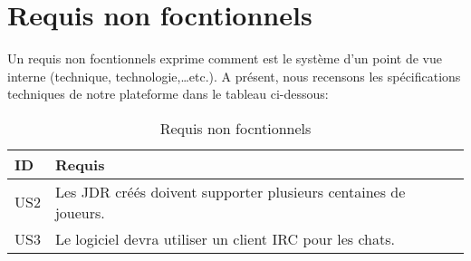 \documentclass[12pt,a4paper]{article}
\begin{document}
\section{Requis non focntionnels}
Un requis non focntionnels exprime comment est le
système d’un point de vue interne (technique,
technologie,…etc.). A présent, nous recensons les spécifications techniques de notre plateforme dans le tableau ci-dessous:
    \begin{table}[H]
	\centering

	\label{specifnonFonct}
	\begin{tabular}{|l | p{14.5cm}| }
		\hline	ID & Requis      \\\hline           
		US2	&Les JDR créés doivent supporter plusieurs centaines de joueurs. \\ \hline
		US3	&Le logiciel devra utiliser un client IRC pour les chats. \\ \hline
		
	\end{tabular}
		\caption{Requis non focntionnels}
\end{table}
%	
\end{document}
